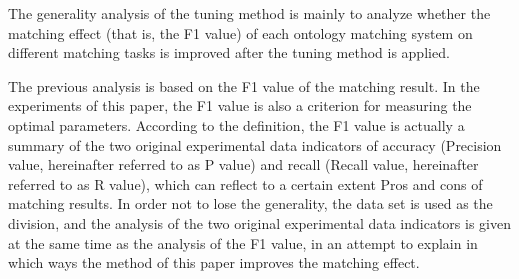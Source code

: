 \documentclass[twoside]{article}
\begin{document}
The generality analysis of the tuning method is mainly to analyze whether the matching effect (that is, the F1 value) of each ontology matching system on different matching tasks is improved after the tuning method is applied.

The previous analysis is based on the F1 value of the matching result. In the experiments of this paper, the F1 value is also a criterion for measuring the optimal parameters.
According to the definition, the F1 value is actually a summary of the two original experimental data indicators of accuracy (Precision value, hereinafter referred to as P value) and recall (Recall value, hereinafter referred to as R value), which can reflect to a certain extent Pros and cons of matching results.
In order not to lose the generality, the data set is used as the division, and the analysis of the two original experimental data indicators is given at the same time as the analysis of the F1 value, in an attempt to explain in which ways the method of this paper improves the matching effect.
\end{document}
